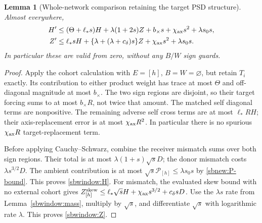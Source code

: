\documentclass{article} %
\theoremstyle{plain}
\newtheorem{lemma}[theorem]{Lemma}
\theoremstyle{definition}
\theoremstyle{remark}
\begin{document}
\begin{lemma}[Whole-network comparison retaining the target PSD structure]
\label{sbwindow:early-system}
Almost everywhere,
\begin{align}
 H'&\le(\Theta+\ell_*s)H+\lambda(1+2s)Z
            +b_\times s+\chi_{\rm ax}s^2+\lambda s_0s,
                  \label{sbwindow:H}\\
 Z'&\le\ell_*sH+\{\lambda+(\lambda+c_\delta)s\}Z
                   +\chi_{\rm ax}s^2+\lambda s_0s.
                  \label{sbwindow:Z}
\end{align}
In particular these are valid from zero, without any $B/W$ sign guards.
\end{lemma}
\begin{proof}
Apply the cohort calculation with $E=[h]$, $B=W=\varnothing$, but retain
$T_i$ exactly. Its contribution to either product weight has trace at
most $\Theta$ and off-diagonal magnitude at most $b_\times$. The two
sign regions are disjoint, so their target forcing sums to at most
$b_\times R$, not twice that amount. The matched self diagonal terms
are nonpositive. The remaining adverse self cross terms are at most
$\ell_*R H$; their axis-replacement error is at most
$\chi_{\rm ax}R^2$. In particular there is no spurious
$\chi_{\rm ax}R$ target-replacement term.

Before applying Cauchy--Schwarz, combine the receiver mismatch sums over
both sign regions. Their total is at most
$\lambda(1+s)\sqrt{s}D$; the donor mismatch costs
$\lambda s^{3/2}D$. The ambient contribution is at most
$\sqrt{s}\mathcal P_{[h]}\le\lambda s_0s$ by
\eqref{sbnew:P-bound}. This proves \eqref{sbwindow:H}.
For mismatch, the evaluated skew bound with no external cohort gives
$Z_{[h]}^{\rm skew}\le\ell_*\sqrt{s}H+
\chi_{\rm ax}s^{3/2}+c_\delta sD$.
Use the $\lambda s$ rate from Lemma~\ref{sbwindow:mass}, multiply by
$\sqrt{s}$, and differentiate $\sqrt{s}$ with logarithmic rate
$\lambda$. This proves \eqref{sbwindow:Z}.
\end{proof}
\end{document}
